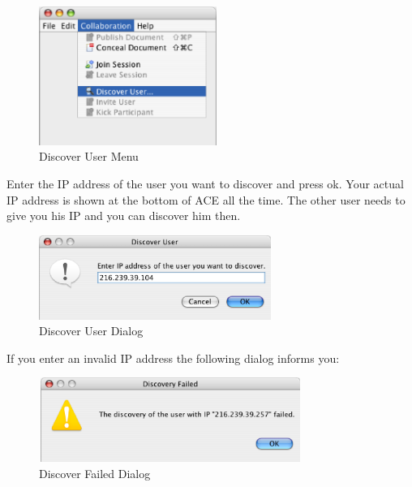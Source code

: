 \documentclass[11pt,a4paper]{article}
\begin{document}
\begin{figure}[H]
\begin{center}
  \includegraphics[height=1.78in, width=2.28in]{../images/usermanual/menu_collab_discover.eps}
\caption{Discover User Menu}
\end{center}
\end{figure}

Enter the IP address of the user you want to discover and press ok. Your actual IP address is shown at the bottom of ACE all the time. The other user needs to give you his IP and you can discover him then.

\begin{figure}[H]
\begin{center}
  \includegraphics[height=1.08in, width=2.98in]{../images/usermanual/ace_discover.eps}
\caption{Discover User Dialog}
\label{discover_dialog}
\end{center}
\end{figure}

If you enter an invalid IP address the following dialog informs you:

\begin{figure}[H]
\begin{center}
  \includegraphics[height=1.08in, width=3.38in]{../images/usermanual/discover_failed_inv_ip.eps}
\caption{Discover Failed Dialog}
\end{center}
\end{figure}
\end{document}
